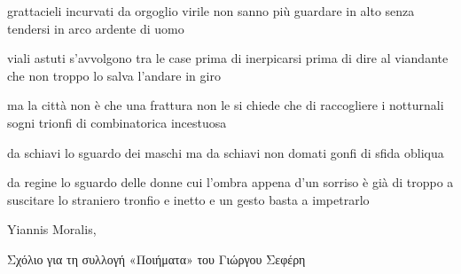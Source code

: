 \clearpage


\begin{poem}
	\begin{stanza}
		grattacieli incurvati\verseline
		da orgoglio virile\verseline
		non sanno più guardare in alto\verseline
		senza tendersi in arco ardente di uomo
	\end{stanza}
\end{poem}

\clearpage


\begin{poem}
	\begin{stanza}
		viali astuti s'avvolgono\verseline
		tra le case prima di inerpicarsi\verseline
		prima di dire al viandante\verseline
		che non troppo lo salva\verseline
		l’andare in giro
	\end{stanza}

	\begin{stanza}
		ma la città non è che una frattura\verseline
		non le si chiede che di raccogliere\verseline
		i notturnali sogni\verseline
		trionfi di combinatorica incestuosa
	\end{stanza}
\end{poem}

\clearpage


\begin{poem}
	\begin{stanza}
		da schiavi lo sguardo dei maschi\verseline
		ma da schiavi non domati\verseline
		gonfi di sfida obliqua
	\end{stanza}

	\begin{stanza}
		da regine lo sguardo delle donne\verseline
		cui l'ombra appena d'un sorriso\verseline
		è già di troppo a suscitare\verseline
		lo straniero tronfio e inetto\verseline
		e un gesto basta a impetrarlo
	\end{stanza}
\end{poem}

\clearpage


\begin{artItem}
	Yiannis Moralis, \begin{otherlanguage}{greek}%
		Σχόλιο για τη συλλογή «Ποιήματα» του Γιώργου Σεφέρη%
	\end{otherlanguage}
\end{artItem}

